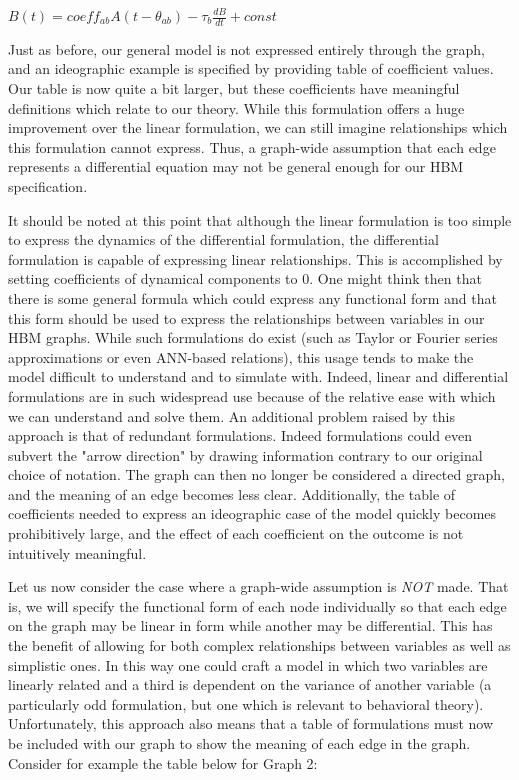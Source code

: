 \documentclass[conference]{IEEEtran}
\begin{document}
$B(t) = coeff_{ab}A(t-\theta_{ab}) - \tau_{b}\frac{dB}{dt} + const$

Just as before, our general model is not expressed entirely through the graph, and an ideographic example is specified by providing table of coefficient values.
Our table is now quite a bit larger, but these coefficients have meaningful definitions which relate to our theory.
While this formulation offers a huge improvement over the linear formulation, we can still imagine relationships which this formulation cannot express.
Thus, a graph-wide assumption that each edge represents a differential equation may not be general enough for our HBM specification. 

It should be noted at this point that although the linear formulation is too simple to express the dynamics of the differential formulation, the differential formulation is capable of expressing linear relationships.
This is accomplished by setting coefficients of dynamical components to 0.
One might think then that there is some general formula which could express any functional form and that this form should be used to express the relationships between variables in our HBM graphs.
While such formulations do exist (such as Taylor or Fourier series approximations or even ANN-based relations), this usage tends to make the model difficult to understand and to simulate with.
Indeed, linear and differential formulations are in such widespread use because of the relative ease with which we can understand and solve them. An additional problem raised by this approach is that of redundant formulations.
Indeed formulations could even subvert the "arrow direction" by drawing information contrary to our original choice of notation.
The graph can then no longer be considered a directed graph, and the meaning of an edge becomes less clear.
Additionally, the table of coefficients needed to express an ideographic case of the model quickly becomes prohibitively large, and the effect of each coefficient on the outcome is not intuitively meaningful.

Let us now consider the case where a graph-wide assumption is \emph{NOT} made.
That is, we will specify the functional form of each node individually so that each edge on the graph may be linear in form while another may be differential.
This has the benefit of allowing for both complex relationships between variables as well as simplistic ones.
In this way one could craft a model in which two variables are linearly related and a third is dependent on the variance of another variable (a particularly odd formulation, but one which is relevant to behavioral theory).
Unfortunately, this approach also means that a table of formulations must now be included with our graph to show the meaning of each edge in the graph.
Consider for example the table below for Graph 2:
\end{document}
